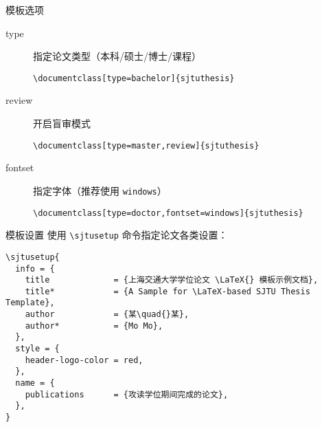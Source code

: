 \begin{frame}[fragile]{模板选项}
  \begin{description}
    \item[type] 指定论文类型（本科/硕士/博士/课程）
          \begin{lstlisting}[basicstyle=\ttfamily]
\documentclass[type=bachelor]{sjtuthesis}
  \end{lstlisting}
    \item[review] 开启盲审模式
          \begin{lstlisting}[basicstyle=\ttfamily]
\documentclass[type=master,review]{sjtuthesis}
  \end{lstlisting}
    \item[fontset] 指定字体（推荐使用 \verb|windows|）
          \begin{lstlisting}[basicstyle=\ttfamily]
\documentclass[type=doctor,fontset=windows]{sjtuthesis}
  \end{lstlisting}
  \end{description}
\end{frame}

\begin{frame}[fragile]{模板设置}
  使用 \verb|\sjtusetup| 命令指定论文各类设置：
  \begin{lstlisting}
\sjtusetup{
  info = {
    title             = {上海交通大学学位论文 \LaTeX{} 模板示例文档},
    title*            = {A Sample for \LaTeX-based SJTU Thesis Template},
    author            = {某\quad{}某},
    author*           = {Mo Mo},
  },
  style = {
    header-logo-color = red,
  },
  name = {
    publications      = {攻读学位期间完成的论文},
  },
}
  \end{lstlisting}
\end{frame}

